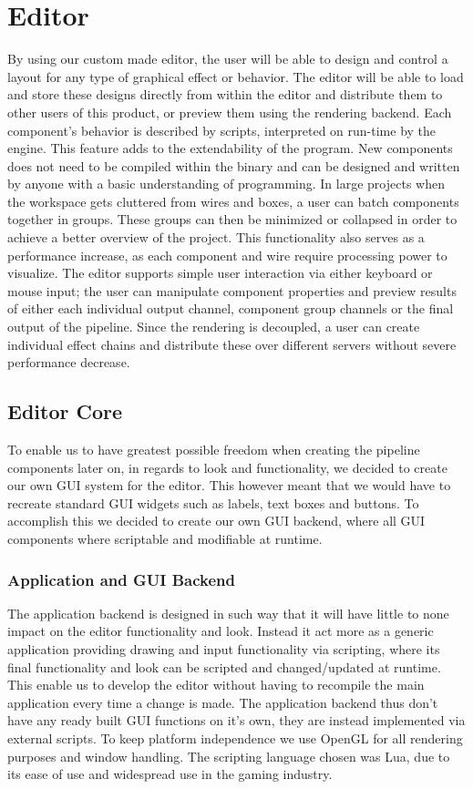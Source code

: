 
\chapter{Editor}
 
By using our custom made editor, the user will be able to design and control a layout for any type of graphical effect or behavior. The editor will be able to load and store these designs directly from within the editor and distribute them to other users of this product, or preview them using the rendering backend. 
Each component’s behavior is described by scripts, interpreted on run-time by the engine. This feature adds to the extendability of the program. New components does not need to be compiled within the binary and can be designed and written by anyone with a basic understanding of programming.
In large projects when the workspace gets cluttered from wires and boxes, a user can batch components together in groups. These groups can then be minimized or collapsed in order to achieve a better overview of the project. This functionality also serves as a performance increase, as each component and wire require processing power to visualize. 
The editor supports simple user interaction via either keyboard or mouse input; the user can manipulate component properties and preview results of either each individual output channel, component group channels or the final output of the pipeline. Since the rendering is decoupled, a user can create individual effect chains and distribute these over different servers without severe performance decrease. 

\section{Editor Core}
To enable us to have greatest possible freedom when creating the pipeline components later on, in regards to look and functionality, we decided to create our own GUI system for the editor. This however meant that we would have to recreate standard GUI widgets such as labels, text boxes and buttons. To accomplish this we decided to create our own GUI backend, where all GUI components where scriptable and modifiable at runtime.

\subsection{Application and GUI Backend}
The application backend is designed in such way that it will have little to none impact on the editor functionality and look. Instead it act more as a generic application providing drawing and input functionality via scripting, where its final functionality and look can be scripted and changed/updated at runtime. This enable us to develop the editor without having to recompile the main application every time a change is made. The application backend thus don't have any ready built GUI functions on it's own, they are instead implemented via external scripts. To keep platform independence we use OpenGL for all rendering purposes and window handling. The scripting language chosen was Lua, due to its ease of use and widespread use in the gaming industry.

